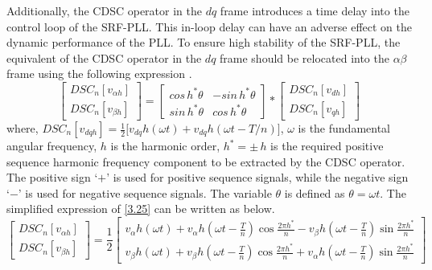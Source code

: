 Additionally, the CDSC operator in the $dq$ frame introduces a time delay into the control loop of the SRF-PLL. This in-loop delay can have an adverse effect on the dynamic performance of the PLL. To ensure high stability of the SRF-PLL, the equivalent of the CDSC operator in the $dq$ frame should be relocated into the $\alpha\beta$ frame using the following expression \cite{5668509}.
\begin{equation} \label{3.25}
	\begin{bmatrix}
		DSC_{n}[ v_{\alpha h} ]\\
		DSC_{n}[ v_{\beta h} ]
	\end{bmatrix}
	= 
	\begin{bmatrix}
		cos\,h^{*}\theta & -sin \,h^{*}\theta\\
		sin \,h^{*}\theta & cos \,h^{*}\theta
	\end{bmatrix}
	*
	\begin{bmatrix}
		DSC_{n}[ v_{dh} ]\\
		DSC_{n}[ v_{qh} ]
	\end{bmatrix}
\end{equation} 
where, $DSC_{n}[ v_{dqh} ] = \frac{1}{2} \big[ v_{dq}h(\omega t) + v_{dq} h( \omega t-T/n ) \big]$, $\omega$ is the fundamental angular frequency, $h$ is the harmonic order, $h^{*} = \pm \, h$ is the required positive sequence harmonic frequency component to be extracted by the CDSC operator. The positive sign `$+$' is used for positive sequence signals, while the negative sign `$-$' is used for negative sequence signals. The variable $\theta$ is defined as $\theta = \omega t$. The simplified expression of \eqref{3.25} can be written as below.
\vspace*{-0.5cm}
\begin{equation} \label{3.26} 
\begin{bmatrix}
DSC_{n}[ v_{\alpha h} ]\\ %
DSC_{n}[ v_{\beta h} ]
\end{bmatrix}
= \frac{1}{2}
\begin{bmatrix}
v_{\alpha} h(\omega t) + v_{\alpha} h(\omega t - \frac{T}{n}) \cos \frac{2\pi h^{*}} { n }  - v_{\beta} h(\omega t - \frac{T}{n}) \sin \frac{2\pi h^{*}} { n }  \\%
v_{\beta} h(\omega t) + v_{\beta} h(\omega t - \frac{T}{n}) \cos \frac{2\pi h^{*}} { n } + v_{\alpha} h(\omega t - \frac{T}{n}) \sin \frac{2\pi h^{*}} { n }
\end{bmatrix}
\end{equation}

